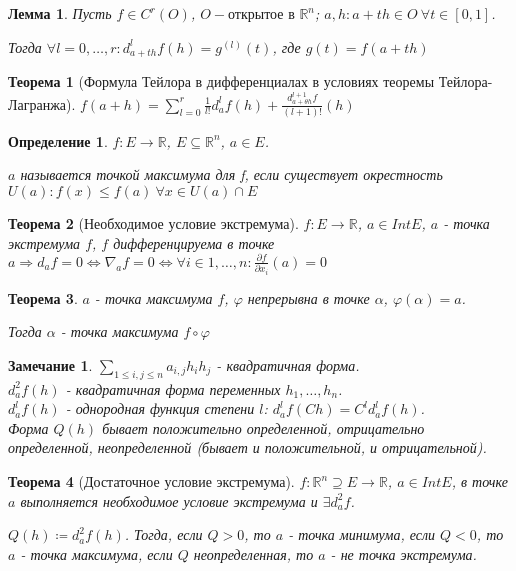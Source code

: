 \documentclass[11pt,a4paper,oneside]{scrartcl}
\newtheorem{definition}{Определение}
\newtheorem{lemma}{Лемма}
\newtheorem{theorem}{Теорема}
\newtheorem*{remark}{Замечание}
\begin{document}
\begin{lemma}
    Пусть $f \in C^r (O)$, $O - \text{открытое в } \mathbb{R}^n$;
    $a, h: a+th \in O \ \forall t \in [0, 1]$.

    Тогда $\forall l = 0, \dots, r: d_{a+th}^l f(h) = g^{(l)} (t)$, где $g(t) = f(a+th)$
\end{lemma}

\begin{theorem}[Формула Тейлора в дифференциалах в условиях теоремы Тейлора-Лагранжа]
    $f(a+h) = \sum_{l=0}^r \frac{1}{l!} d_a^l f(h) + \frac{d^{l+1}_{a + \theta h} f}{(l + 1)!}(h)$
\end{theorem}

\begin{definition}
    $f: E \rightarrow \mathbb{R}$, $E \subseteq \mathbb{R}^n$, $a \in E$.

    $a$ называется точкой максимума для f, если существует окрестность
        $U(a): f(x) \leq f(a) \ \forall x \in U(a) \cap E$
\end{definition}

\begin{theorem}[Необходимое условие экстремума]
    $f: E \rightarrow \mathbb{R}$, $a \in Int E$, $a$ - точка экстремума $f$,
    $f$ дифференцируема в точке $a \Rightarrow d_a f = 0
    \Leftrightarrow \nabla_a f = 0
    \Leftrightarrow \forall i \in {1, \dots, n} : \frac{\partial f}{\partial x_i}(a) = 0$
\end{theorem}

\begin{theorem}
    $a$ - точка максимума $f$, $\varphi$ непрерывна в точке $\alpha$, $\varphi(\alpha) = a$.

    Тогда $\alpha$ - точка максимума $f \circ \varphi$
\end{theorem}

\begin{remark}
    $\sum_{1 \leq i, j \leq n} a_{i,j} h_i h_j$ - квадратичная форма. \\
    $d_a^2 f(h)$ - квадратичная форма переменных $h_1, \dots, h_n$. \\
    $d_a^l f(h)$ - однородная функция степени $l$: $d_a^l f(Ch) = C^l d_a^l f(h)$. \\
    Форма $Q(h)$ бывает положительно определенной, отрицательно определенной,
    неопределенной (бывает и положительной, и отрицательной).
\end{remark}

\begin{theorem}[Достаточное условие экстремума]
    $f: \mathbb{R}^n \supseteq E \rightarrow \mathbb{R}$, $a \in Int E$,
    в точке $a$ выполняется необходимое условие экстремума и $\exists d_a^2 f$.

    $Q(h) \coloneqq d_a^2 f(h)$. Тогда, если $Q > 0$, то $a$ - точка минимума,
    если $Q < 0$, то $a$ - точка максимума,
    если $Q$ неопределенная, то $a$ - не точка экстремума.
\end{theorem}
\end{document}

